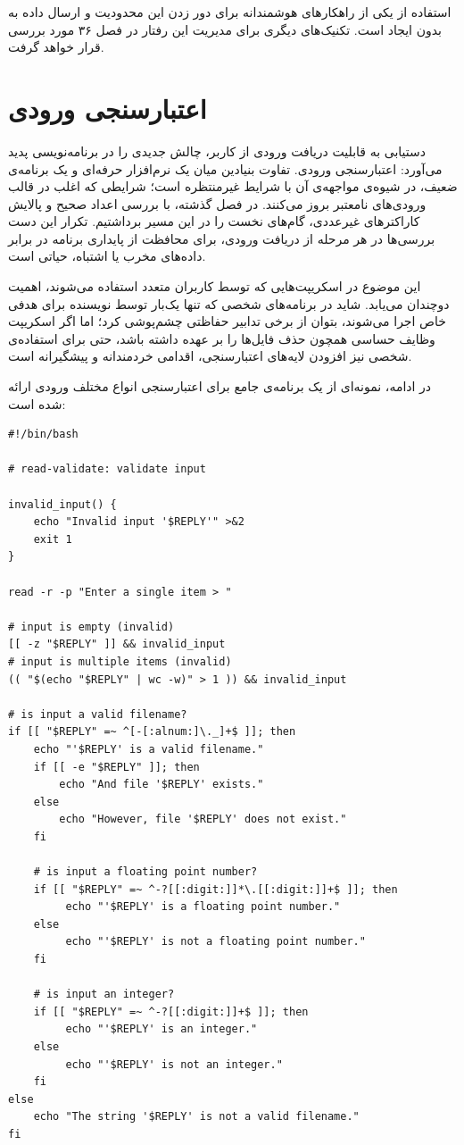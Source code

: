 استفاده از  یکی از راهکارهای هوشمندانه برای دور زدن این محدودیت و ارسال داده به  بدون ایجاد  است. تکنیک‌های دیگری برای مدیریت این رفتار در فصل ۳۶ مورد بررسی قرار خواهد گرفت.

\section{اعتبارسنجی ورودی}

دستیابی به قابلیت دریافت ورودی از کاربر، چالش جدیدی را در برنامه‌نویسی پدید می‌آورد: اعتبارسنجی ورودی. تفاوت بنیادین میان یک نرم‌افزار حرفه‌ای و یک برنامه‌ی ضعیف، در شیوه‌ی مواجهه‌ی آن با شرایط غیرمنتظره است؛ شرایطی که اغلب در قالب ورودی‌های نامعتبر بروز می‌کنند. در فصل گذشته، با بررسی اعداد صحیح و پالایش کاراکترهای غیرعددی، گام‌های نخست را در این مسیر برداشتیم. تکرار این دست بررسی‌ها در هر مرحله از دریافت ورودی، برای محافظت از پایداری برنامه در برابر داده‌های مخرب یا اشتباه، حیاتی است.

این موضوع در اسکریپت‌هایی که توسط کاربران متعدد استفاده می‌شوند، اهمیت دوچندان می‌یابد. شاید در برنامه‌های شخصی که تنها یک‌بار توسط نویسنده برای هدفی خاص اجرا می‌شوند، بتوان از برخی تدابیر حفاظتی چشم‌پوشی کرد؛ اما اگر اسکریپت وظایف حساسی همچون حذف فایل‌ها را بر عهده داشته باشد، حتی برای استفاده‌ی شخصی نیز افزودن لایه‌های اعتبارسنجی، اقدامی خردمندانه و پیشگیرانه است.

در ادامه، نمونه‌ای از یک برنامه‌ی جامع برای اعتبارسنجی انواع مختلف ورودی ارائه شده است:

\begin{latin}
\begin{lstlisting}
#!/bin/bash

# read-validate: validate input

invalid_input() {
    echo "Invalid input '$REPLY'" >&2
    exit 1
}

read -r -p "Enter a single item > "

# input is empty (invalid)
[[ -z "$REPLY" ]] && invalid_input
# input is multiple items (invalid)
(( "$(echo "$REPLY" | wc -w)" > 1 )) && invalid_input

# is input a valid filename?
if [[ "$REPLY" =~ ^[-[:alnum:]\._]+$ ]]; then
    echo "'$REPLY' is a valid filename."
    if [[ -e "$REPLY" ]]; then
        echo "And file '$REPLY' exists."
    else
        echo "However, file '$REPLY' does not exist."
    fi

    # is input a floating point number?
    if [[ "$REPLY" =~ ^-?[[:digit:]]*\.[[:digit:]]+$ ]]; then
         echo "'$REPLY' is a floating point number."
    else
         echo "'$REPLY' is not a floating point number."
    fi

    # is input an integer?
    if [[ "$REPLY" =~ ^-?[[:digit:]]+$ ]]; then
         echo "'$REPLY' is an integer."
    else
         echo "'$REPLY' is not an integer."
    fi
else
    echo "The string '$REPLY' is not a valid filename."
fi
\end{lstlisting}
\end{latin}

